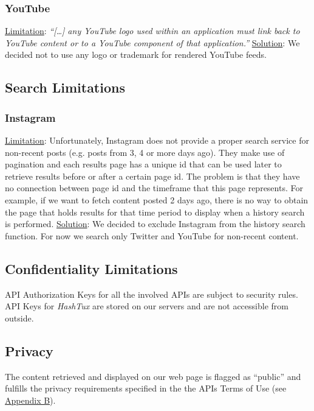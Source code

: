 \subsubsection{YouTube}
\underline{Limitation}: \textit{``[\dots] any YouTube logo used within an
application must link back to YouTube content or to a YouTube component of
that application.''} \newline
\underline{Solution}: We decided not to use any logo or trademark for rendered
YouTube feeds.

\subsection{Search Limitations}
\subsubsection{Instagram}
\underline{Limitation}: Unfortunately, Instagram does not provide a proper
search service for non-recent posts (e.g. posts from 3, 4 or more days ago).
They make use of pagination and each results page has a unique id that can be
used later to retrieve results before or after a certain page id. The problem is
that they have no connection between page id and the timeframe that this page
represents. For example, if we want to fetch content posted 2 days ago, there is
no way to obtain the page that holds results for that time period to display
when a history search is performed. \newline
\underline{Solution}: We decided to exclude Instagram from the history search
function. For now we search only Twitter and YouTube for non-recent content.

\subsection{Confidentiality Limitations}
API Authorization Keys for all the involved APIs are subject to security rules.
API Keys for \textit{HashTux} are stored on our servers and are not accessible
from outside.

\subsection{Privacy}
The content retrieved and displayed on our web page is flagged as “public” and
fulfills the privacy requirements specified in the the APIs Terms of Use
(see \hyperlink{appb}{Appendix B}).